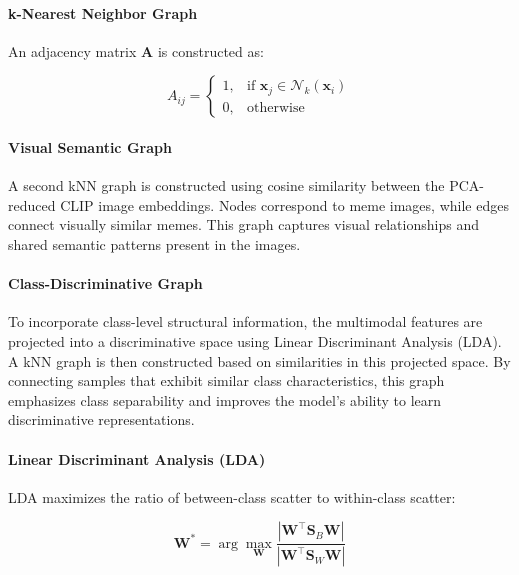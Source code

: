 \documentclass[a4paper]{cas-sc}
\begin{document}
\paragraph{k-Nearest Neighbor Graph}

An adjacency matrix $\mathbf{A}$ is constructed as:

\begin{equation}
A_{ij} =
\begin{cases}
1, & \text{if } \mathbf{x}_j \in \mathcal{N}_k(\mathbf{x}_i) \\
0, & \text{otherwise}
\end{cases}
\end{equation}

\paragraph{Visual Semantic Graph}

A second kNN graph is constructed using cosine similarity between the PCA-reduced CLIP image embeddings. Nodes correspond to meme images, while edges connect visually similar memes. This graph captures visual relationships and shared semantic patterns present in the images.

\paragraph{Class-Discriminative Graph}

To incorporate class-level structural information, the multimodal features are projected into a discriminative space using Linear Discriminant Analysis (LDA). A kNN graph is then constructed based on similarities in this projected space. By connecting samples that exhibit similar class characteristics, this graph emphasizes class separability and improves the model’s ability to learn discriminative representations.

\paragraph{Linear Discriminant Analysis (LDA)}

LDA maximizes the ratio of between-class scatter to within-class scatter:

\begin{equation}
\mathbf{W}^* = \arg\max_{\mathbf{W}} 
\frac{|\mathbf{W}^\top \mathbf{S}_B \mathbf{W}|}
{|\mathbf{W}^\top \mathbf{S}_W \mathbf{W}|}
\end{equation}
\end{document}
